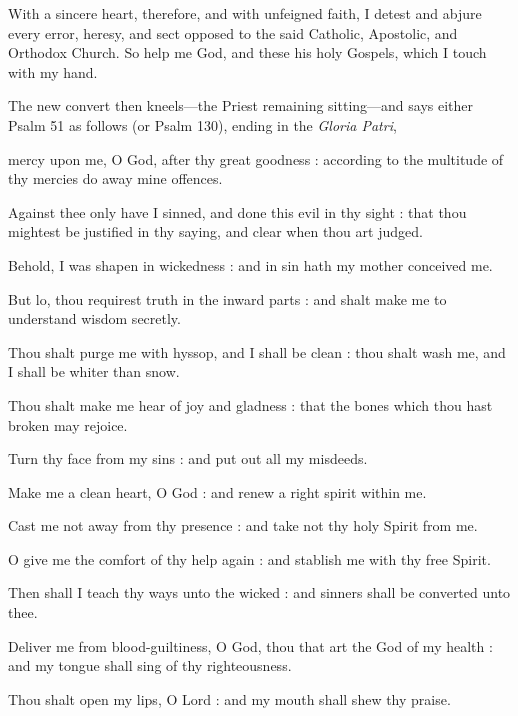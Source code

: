 With a sincere heart, therefore, and with unfeigned faith, I detest and abjure every error, heresy, and sect opposed to the said Catholic, Apostolic, and 
Orthodox Church. So help me God, and these his holy Gospels, which I touch with my hand.
\begin{rubric}
    The new convert then kneels---the Priest remaining sitting---and says either Psalm 51 as follows (or Psalm 130), ending in the \emph{Gloria Patri},
\end{rubric}
 mercy upon me, O God, after thy great goodness : according to the multitude of thy mercies do away mine offences.\par
{}
Against thee only have I sinned, and done this evil in thy sight : that thou mightest be justified in thy saying, and clear when thou art judged.\par
{}Behold, I was shapen in wickedness : and in sin hath my mother conceived me.\par
{}But lo, thou requirest truth in the inward parts : and shalt make me to understand wisdom secretly.\par
{}Thou shalt purge me with hyssop, and I shall be clean : thou shalt wash me, and I shall be whiter than snow.\par
{}Thou shalt make me hear of joy and gladness : that the bones which thou hast broken may rejoice.\par
{}Turn thy face from my sins : and put out all my misdeeds.\par
{}Make me a clean heart, O God : and renew a right spirit within me.\par
{}Cast me not away from thy presence : and take not thy holy Spirit from me.\par
{}O give me the comfort of thy help again : and stablish me with thy free Spirit.\par
{}Then shall I teach thy ways unto the wicked : and sinners shall be converted unto thee.\par
{}Deliver me from blood-guiltiness, O God, thou that art the God of my health : and my tongue shall sing of thy righteousness.\par
{}Thou shalt open my lips, O Lord : and my mouth shall shew thy praise.\par

